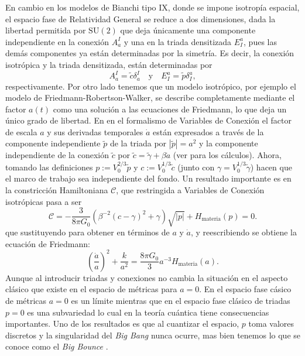 En cambio en los modelos de Bianchi tipo IX, donde se impone isotrop\'{i}a espacial, el espacio fase de Relatividad General se reduce a dos dimensiones, dada la libertad permitida por $\mathrm{SU}(2)$ que deja \'{u}nicamente una componente independiente en la conexi\'{o}n $A^{I}_{a}$ y una en la triada densitizada $E^{a}_{I}$, pues las dem\'{a}s componentes ya est\'{a}n determinadas por la simetr\'{i}a. Es decir, la conexi\'{o}n isotr\'{o}pica y la triada densitizada, est\'{a}n determinadas por
%
\begin{equation*}
A^{I}_{a} = \tilde{c} \delta^{I}_{a} \quad \mathrm{y} \quad E^{a}_{I} = \tilde{p} \delta^{a}_{I},
\end{equation*}
%
respectivamente. Por otro lado tenemos que un modelo isotr\'{o}pico, por ejemplo el modelo de Friedmann-Robertson-Walker, se describe completamente mediante el factor $a(t)$ como una soluci\'{o}n a las ecuaciones de Friedmann, lo que deja un \'{u}nico grado de libertad. En en el formalismo de Variables de Conexi\'{o}n el factor de escala $a$ y sus derivadas temporales $\dot{a}$ est\'{a}n expresados a trav\'{e}s de la componente independiente $\tilde{p}$ de la triada por $|\tilde{p}| = a^{2}$ y la componente independiente de la conexi\'{o}n $\tilde{c}$ por $\tilde{c} = \tilde{\gamma} + \beta \dot{a}$ (ver \cite{Bojowald2000} para los c\'{a}lculos). Ahora, tomando las definiciones $p := V_{0}^{2/3} \tilde{p}$ y $c := V_{0}^{1/3} \tilde{c}$ (junto con $\gamma = V^{1/3}_{0} \tilde{\gamma}$) hacen que el marco de trabajo sea independiente del fondo. Un resultado importante es en la constricci\'{o}n Hamiltoniana $\mathcal{C}$, que restringida a Variables de Conexi\'{o}n isotr\'{o}picas pasa a ser \cite{Bojowald2002, Bojowald2005}
%
\begin{equation}
\mathcal{C} = -\frac{3}{8 \pi G_{0}} \left( \beta^{-2} (c - \gamma)^{2} + \gamma \right) \sqrt{|p|} + H_{\mathrm{materia}} (p) = 0.
\end{equation}
%
que sustituyendo para obtener en t\'{e}rminos de $a$ y $\dot{a}$, y reescribiendo se obtiene la ecuaci\'{o}n de Friedmann:
%
\begin{equation}
\left( \frac{\dot{a}}{a} \right)^{2} + \frac{k}{a^{2}} = \frac{8 \pi G_{0}}{3} a^{-3} H_{\mathrm{materia}}(a).
\end{equation}
%
Aunque al introducir triadas y conexiones no cambia la situaci\'{o}n en el aspecto cl\'{a}sico que existe en el espacio de m\'{e}tricas para $a = 0$. En el espacio fase c\'{a}sico de m\'{e}tricas $a = 0$ es un l\'{i}mite mientras que en el espacio fase cl\'{asico} de triadas $p = 0$ es una subvariedad lo cual en la teor\'{i}a cu\'{a}ntica tiene consecuencias importantes. {\color{red} Uno de los resultados es que al cuantizar el espacio, $p$ toma valores discretos y la singularidad del \emph{Big Bang} nunca ocurre, mas bien tenemos lo que se conoce como el \emph{Big Bounce} \cite{BB}.}